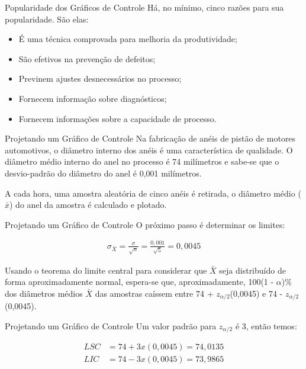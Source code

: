 \documentclass[12pt]{beamer}
\begin{document}
  \begin{frame}[t]{Popularidade dos Gráficos de Controle}
    Há, no mínimo, cinco razões para sua popularidade. São elas:

    \begin{itemize}
      \item É uma técnica comprovada para melhoria da produtividade;

      \item São efetivos na prevenção de defeitos;

      \item Previnem ajustes desnecessários no processo;

      \item Fornecem informação sobre diagnósticos;

      \item Fornecem informações sobre a capacidade de processo.
    \end{itemize}
  \end{frame}

  \begin{frame}[t]{Projetando um Gráfico de Controle}
    Na fabricação de anéis de pistão de motores automotivos, o diâmetro interno dos anéis é uma característica de qualidade. O diâmetro médio interno do anel no processo é 74 milímetros e sabe-se que o desvio-padrão do diâmetro do anel é 0,001 milímetros.\newline

    A cada hora, uma amostra aleatória de cinco anéis é retirada, o diâmetro médio ($\bar x$) do anel da amostra é calculado e plotado.
  \end{frame}

  \begin{frame}[t]{Projetando um Gráfico de Controle}
    O próximo passo é determinar os limites:

    \begin{align*}
      \sigma_{\bar{X}} = \frac{\sigma}{\sqrt{n}} = \frac{0,001}{\sqrt{5}} = 0,0045
    \end{align*}

    Usando o teorema do limite central para considerar que $\bar X $ seja distribuído de forma aproximadamente normal, espera-se que, aproximadamente, 100(1 - $\alpha$)\% dos diâmetros médios $\bar X  $ das amostras caíssem entre 74 + $z_{\alpha/2}$(0,0045) e 74 - $z_{\alpha/2}$(0,0045).
  \end{frame}

  \begin{frame}[t]{Projetando um Gráfico de Controle}
    Um valor padrão para $z_{\alpha/2}$ é 3, então temos:

    \begin{align*}
      LSC & =  74 + 3x(0,0045) = 74,0135 \\
      LIC & =  74 - 3x(0,0045) = 73,9865
    \end{align*}
  \end{frame}
\end{document}
